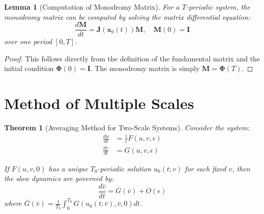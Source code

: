 \documentclass{article}
\newtheorem{theorem}{Theorem}
\newtheorem{lemma}{Lemma}
\begin{document}
\begin{lemma}[Computation of Monodromy Matrix]
For a $T$-periodic system, the monodromy matrix can be computed by solving the matrix differential equation:
\begin{equation}
\frac{d\mathbf{M}}{dt} = \mathbf{J}(\mathbf{x}_0(t))\mathbf{M}, \quad \mathbf{M}(0) = \mathbf{I}
\end{equation}
over one period $[0,T]$.
\end{lemma}

\begin{proof}
This follows directly from the definition of the fundamental matrix and the initial condition $\boldsymbol{\Phi}(0) = \mathbf{I}$. The monodromy matrix is simply $\mathbf{M} = \boldsymbol{\Phi}(T)$.
\end{proof}

\section{Method of Multiple Scales}

\begin{theorem}[Averaging Method for Two-Scale Systems]
Consider the system:
\begin{align}
\frac{du}{dt} &= \frac{1}{\epsilon}F(u,v,\epsilon) \\
\frac{dv}{dt} &= G(u,v,\epsilon)
\end{align}

If $F(u,v,0)$ has a unique $T_0$-periodic solution $u_0(t;v)$ for each fixed $v$, then the slow dynamics are governed by:
\begin{equation}
\frac{d\bar{v}}{dt} = \bar{G}(\bar{v}) + O(\epsilon)
\end{equation}
where $\bar{G}(\bar{v}) = \frac{1}{T_0}\int_0^{T_0} G(u_0(t;\bar{v}), \bar{v}, 0) dt$.
\end{theorem}
\end{document}
